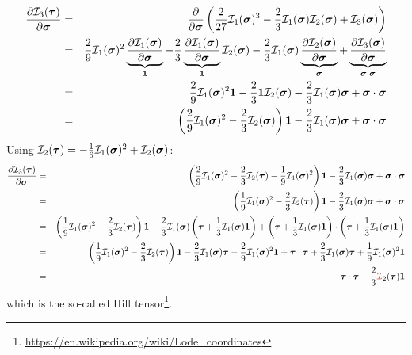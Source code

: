 \begin{eqnarray}
\frac{\partial {\cal I}_3(\bm\tau)}{\partial \bm\sigma} 
&=&
\frac{\partial }{\partial \bm\sigma} 
\left( \frac{2}{27} {\cal I}_1(\bm\sigma)^3 
- \frac{2}{3} {\cal I}_1(\bm\sigma){\cal I}_2(\bm\sigma) + {\cal I}_3(\bm\sigma) \right) \nonumber\\
&=& 
\frac{2}{9} {\cal I}_1(\bm\sigma)^2  
\underbrace{ \frac{\partial  {\cal I}_1(\bm\sigma)}{\partial \bm\sigma} }_{\bm 1} 
-\frac23 
\underbrace{ \frac{\partial {\cal I}_1(\bm\sigma)}{\partial \bm\sigma}}_{\bm 1}   {\cal I}_2(\bm\sigma) 
-\frac23 {\cal I}_1(\bm\sigma)  
\underbrace{ \frac{\partial  {\cal I}_2(\bm\sigma)}{\partial \bm\sigma} }_{\bm \sigma}
+ 
\underbrace{\frac{\partial {\cal I}_3(\bm\sigma)}{\partial \bm\sigma}}_{\bm\sigma\cdot\bm\sigma}  \nonumber\\
&=& 
\frac{2}{9} {\cal I}_1(\bm\sigma)^2 {\bm 1} 
-\frac23 {\bm 1}   {\cal I}_2(\bm\sigma) 
-\frac23 {\cal I}_1(\bm\sigma)  {\bm \sigma}
+ \bm\sigma\cdot\bm\sigma \nonumber\\
&=& \left(\frac29 {\cal I}_1(\bm\sigma)^2 - \frac23  {\cal I}_2(\bm\sigma)    \right)  {\bm 1}
-\frac23 {\cal I}_1(\bm\sigma)  {\bm \sigma}
+ \bm\sigma\cdot\bm\sigma
\end{eqnarray}
Using ${\cal I}_2(\bm\tau) = -\frac16 {\cal I}_1(\bm\sigma)^2 + {\cal I}_2(\bm\sigma)$:
\begin{eqnarray}
\frac{\partial {\cal I}_3(\bm\tau)}{\partial \bm\sigma} 
&=& \left(\frac29 {\cal I}_1(\bm\sigma)^2 - \frac23  {\cal I}_2(\bm\tau) 
-\frac19 {\cal I}_1(\bm\sigma)^2    \right)  {\bm 1}
-\frac23 {\cal I}_1(\bm\sigma)  {\bm \sigma}
+ \bm\sigma\cdot\bm\sigma \nn\\
&=& \left(\frac19 {\cal I}_1(\bm\sigma)^2 - \frac23  {\cal I}_2(\bm\tau) \right)  {\bm 1}
-\frac23 {\cal I}_1(\bm\sigma)  {\bm \sigma}
+ \bm\sigma\cdot\bm\sigma \nn\\
&=& \left(\frac19 {\cal I}_1(\bm\sigma)^2 - \frac23  {\cal I}_2(\bm\tau) \right)  {\bm 1}
-\frac23 {\cal I}_1(\bm\sigma)  \left( \bm\tau + \frac13 {\cal I}_1(\bm\sigma) {\bm 1} \right)
+ \left( \bm\tau + \frac13 {\cal I}_1(\bm\sigma) {\bm 1} \right)
\cdot \left( \bm\tau + \frac13 {\cal I}_1(\bm\sigma) {\bm 1} \right) \nn\\
&=& \left(\frac19 {\cal I}_1(\bm\sigma)^2 - \frac23  {\cal I}_2(\bm\tau) \right)  {\bm 1}
-\frac23 {\cal I}_1(\bm\sigma)  \bm\tau 
-\frac29 {\cal I}_1(\bm\sigma)^2   {\bm 1}
+ \bm\tau\cdot\bm\tau
+\frac23  {\cal I}_1(\bm\sigma) \bm\tau
+\frac19 {\cal I}_1(\bm\sigma)^2   {\bm 1} \nn\\
&=&
\bm\tau\cdot\bm\tau
-
\frac23  {\III}_2(\bm\tau)  {\bm 1}
\end{eqnarray}
which is the so-called Hill tensor\footnote{\url{https://en.wikipedia.org/wiki/Lode_coordinates}}.

